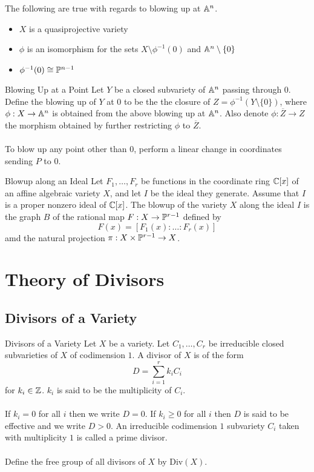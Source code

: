 \documentclass[a4paper]{article}
\begin{document}
\begin{thm}{}{} The following are true with regards to blowing up at $\mathbb{A}^n$. 
\begin{itemize}
\item $X$ is a quasiprojective variety
\item $\phi$ is an isomorphism for the sets $X\setminus\phi^{-1}(0)$ and $\mathbb{A}^n\setminus\{0\}$
\item $\phi^{-1}(0)\cong\mathbb{P}^{n-1}$
\end{itemize}
\end{thm}

\begin{defn}{Blowing Up at a Point}{} Let $Y$ be a closed subvariety of $\mathbb{A}^n$ passing through $0$. Define the blowing up of $Y$ at $0$ to be the the closure of $Z=\phi^{-1}(Y\setminus\{0\})$, where $\phi:X\to\mathbb{A}^n$ is obtained from the above blowing up at $\mathbb{A}^n$. Also denote $\phi:\overline{Z}\to Z$ the morphism obtained by further restricting $\phi$ to $\overline{Z}$. \\~\\
To blow up any point other than $0$, perform a linear change in coordinates sending $P$ to $0$. 
\end{defn}

\begin{defn}{Blowup along an Ideal}{} Let $F_1,\dots,F_r$ be functions in the coordinate ring $\mathbb{C}[x]$ of an affine algebraic variety $X$, and let $I$ be the ideal they generate. Assume that $I$ is a proper nonzero ideal of $\mathbb{C}[x]$. The blowup of the variety $X$ along the ideal $I$ is the graph $B$ of the rational map $F:X\to\mathbb{P}^{r-1}$ defined by $$F(x)=[F_1(x):\dots:F_r(x)]$$ amd the natural projection $\pi:X\times\mathbb{P}^{r-1}\to X$. 
\end{defn}

\pagebreak
\section{Theory of Divisors}
\subsection{Divisors of a Variety}
\begin{defn}{Divisors of a Variety}{} Let $X$ be a variety. Let $C_1,\dots,C_r$ be irreducible closed subvarieties of $X$ of codimension $1$. A divisor of $X$ is of the form $$D=\sum_{i=1}^rk_iC_i$$ for $k_i\in\mathbb{Z}$. $k_i$ is said to be the multiplicity of $C_i$. \\~\\
If $k_i=0$ for all $i$ then we write $D=0$. If $k_i\geq 0$ for all $i$ then $D$ is said to be effective and we write $D>0$. An irreducible codimension $1$ subvariety $C_i$ taken with multiplicity $1$ is called a prime divisor. \\~\\
Define the free group of all divisors of $X$ by $\text{Div}(X)$. 
\end{defn}
\end{document}
